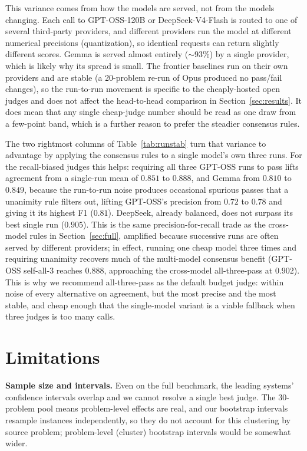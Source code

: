 \documentclass{article}
\begin{document}
This variance comes from how the models are served, not from the models changing.
Each call to GPT-OSS-120B or DeepSeek-V4-Flash is routed to one of several
third-party providers, and different providers run the model at different numerical
precisions (quantization), so identical requests can return slightly different
scores. Gemma is served almost entirely (${\sim}93\%$) by a single provider, which
is likely why its spread is small. The frontier baselines run on their own
providers and are stable (a 20-problem re-run of Opus produced no pass/fail
changes), so the run-to-run movement is specific to the cheaply-hosted open judges
and does not affect the head-to-head comparison in Section~\ref{sec:results}. It
does mean that any single cheap-judge number should be read as one draw from a
few-point band, which is a further reason to prefer the steadier consensus rules.

The two rightmost columns of Table~\ref{tab:runstab} turn that variance to
advantage by applying the consensus rules to a single model's own three runs. For
the recall-biased judges this helps: requiring all three GPT-OSS runs to pass lifts
agreement from a single-run mean of $0.851$ to $0.888$, and Gemma from $0.810$ to
$0.849$, because the run-to-run noise produces occasional spurious passes that a
unanimity rule filters out, lifting GPT-OSS's precision from $0.72$ to $0.78$ and
giving it its highest F1 ($0.81$). DeepSeek, already balanced, does not surpass its
best single run ($0.905$). This is the same precision-for-recall trade as the
cross-model rules in Section~\ref{sec:full}, amplified because successive runs are
often served by different providers; in effect, running one cheap model three times
and requiring unanimity recovers much of the multi-model consensus benefit (GPT-OSS
self-all-3 reaches $0.888$, approaching the cross-model all-three-pass at $0.902$).
This is why we recommend all-three-pass as the default budget judge: within noise of
every alternative on agreement, but the most precise and the most stable, and cheap
enough that the single-model variant is a viable fallback when three judges is too
many calls.

\section{Limitations}
\label{sec:limits}

\textbf{Sample size and intervals.} Even on the full benchmark, the leading
systems' confidence intervals overlap and we cannot resolve a single best judge.
The 30-problem pool means problem-level effects are real, and our bootstrap
intervals resample instances independently, so they do not account for this
clustering by source problem; problem-level (cluster) bootstrap intervals would
be somewhat wider.
\end{document}
